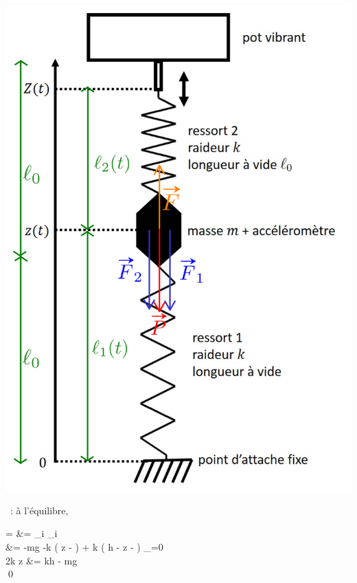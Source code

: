 \documentclass[../main/main.tex]{subfiles}
\begin{document}
{\begin{minipage}[t]{.45\linewidth}
\begin{center}
			\includegraphics[width=\linewidth]{arduino_corr}
		\end{center}
	\end{minipage}
	\begin{itemize}
		~: à l'équilibre,
		\begin{DispWithArrows*}
			\af = \of &= \sum_i \Ff_i
			\\ &=
			-mg
			-k \left( z -  \right)
			+ k \left( h - z -  \right)
			_{=0}
			\\\Lra
			2k z &= kh - mg
			\\\Lra
			\qed
		\end{DispWithArrows*}
	\end{itemize}
}
\end{document}
